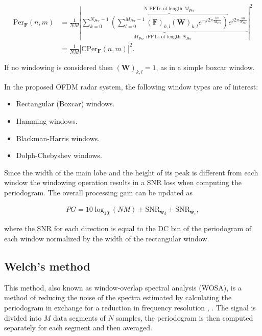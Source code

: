 	
	   \begin{align}
		\text{Per}_{\bm{F}}(n,m) &= \frac{1}{NM} \left| \underbrace{ \sum_{k=0}^{N_{Per}-1}  \overbrace{\left( \sum_{l=0}^{M_{Per}-1} (\bm{F})_{k,l} (\bm{W})_{k,l} e^{-j2\pi \frac{lm}{M_{Per}}} \right)}^{\text{N FFTs of length $M_{Per}$}}  e^{j2\pi\frac{kn}{N_{Per}}}}_{ \text{$M_{Per}$ iFFTs of length $N_{Per}$ }} \right| ^ 2 \label{eq:periodogram_full_win}\\
		&= \frac{1}{NM} \left| \text{CPer}_{\bm{F}}(n,m) \right| ^ 2. \label{eq:periodogram_cper_win}
	\end{align}
	 
	 If no windowing is considered then $(\bm{W})_{k,l} = 1$, as in a simple boxcar window.
	 
	 In the proposed OFDM radar system, the following window types are of interest:
	 
	 \begin{itemize}
	 	\item Rectangular (Boxcar) windows.
	 	\item Hamming windows.
	 	\item Blackman-Harris windows.
	 	\item Dolph-Chebyshev windows.
	 \end{itemize}
	
	
	Since the width of the main lobe and the height of its peak is different from each window the windowing operation results in a SNR loss when computing the periodogram.
	The overall processing gain can be updated as
	
	\begin{align}
		PG = 10\log_{10}(NM) + \text{SNR}_{\bm{w}_d} + \text{SNR}_{\bm{w}_v},
	\end{align}
	
	where the SNR for each direction is equal to the DC bin of the periodogram of each window normalized by the width of the rectangular window.
	
	
	\subsection{Welch's method}
	
	This method, also known as window-overlap spectral analysis (WOSA), is a method of reducing the noise of the spectra estimated by calculating the periodogram in exchange for a reduction in frequency resolution \cite{Welch_period}, \cite{Spagnolini_ch14}.
	The signal is divided into $M$ data segments of $N$ samples, the periodogram is then computed separately for each segment and then averaged.
	
